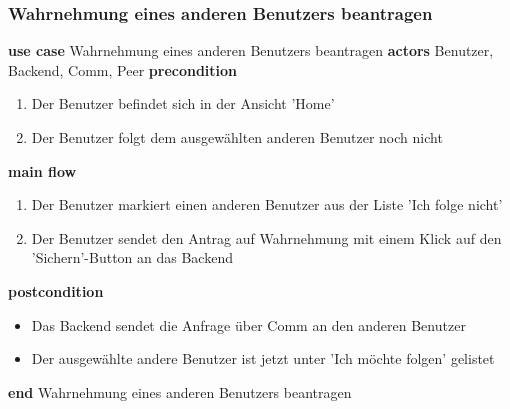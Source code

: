 \subsubsection{Wahrnehmung eines anderen Benutzers beantragen}\label{subsubsec:uc_reqmefollowpeer}
\noindent \textbf{use case} Wahrnehmung eines anderen Benutzers beantragen \newline
\indent \textbf{actors} \newline
\indent \indent Benutzer, Backend, Comm, Peer \newline
\indent \textbf{precondition}
\begin{enumerate}[labelwidth=0pt,leftmargin=39pt,noitemsep,topsep=0pt,parsep=0pt,partopsep=0pt]
\item Der Benutzer befindet sich in der Ansicht 'Home'
\item Der Benutzer folgt dem ausgewählten anderen Benutzer noch nicht
\end{enumerate}
\indent \indent \textbf{main flow}
\begin{enumerate}[labelwidth=0pt,leftmargin=39pt,noitemsep,topsep=0pt,parsep=0pt,partopsep=0pt]
\item Der Benutzer markiert einen anderen Benutzer aus der Liste 'Ich folge nicht'
\item Der Benutzer sendet den Antrag auf Wahrnehmung mit einem Klick auf den 'Sichern'-Button an das Backend
\end{enumerate}
\indent \indent \textbf{postcondition}
\begin{itemize}[labelwidth=0pt,leftmargin=39pt,noitemsep,topsep=0pt,parsep=0pt,partopsep=0pt]
\item Das Backend sendet die Anfrage über Comm an den anderen Benutzer
\item Der ausgewählte andere Benutzer ist jetzt unter 'Ich möchte folgen' gelistet
\end{itemize}
\noindent \textbf{end} Wahrnehmung eines anderen Benutzers beantragen \newline

